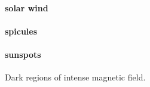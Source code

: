 \documentclass[12pt]{article}
\begin{document}
\paragraph{solar wind}

\paragraph{spicules}

\paragraph{sunspots}
Dark regions of intense magnetic field.
\end{document}
